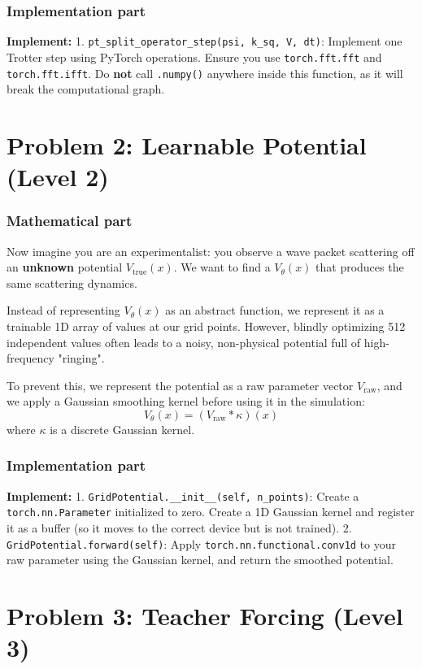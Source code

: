 \documentclass[11pt]{article}
\begin{document}
\subsubsection*{Implementation part}
\textbf{Implement:}
1. \lstinline|pt_split_operator_step(psi, k_sq, V, dt)|: Implement one Trotter step using PyTorch operations. Ensure you use \lstinline|torch.fft.fft| and \lstinline|torch.fft.ifft|. Do \textbf{not} call \lstinline|.numpy()| anywhere inside this function, as it will break the computational graph.

\section*{Problem 2: Learnable Potential (Level 2)}

\subsubsection*{Mathematical part}
Now imagine you are an experimentalist: you observe a wave packet scattering off an \textbf{unknown} potential $V_{\text{true}}(x)$. We want to find a $V_\theta(x)$ that produces the same scattering dynamics.

Instead of representing $V_\theta(x)$ as an abstract function, we represent it as a trainable 1D array of values at our grid points. However, blindly optimizing 512 independent values often leads to a noisy, non-physical potential full of high-frequency "ringing". 

To prevent this, we represent the potential as a raw parameter vector $V_{\text{raw}}$, and we apply a Gaussian smoothing kernel before using it in the simulation:
$$
V_\theta(x) = (V_{\text{raw}} * \kappa)(x)
$$
where $\kappa$ is a discrete Gaussian kernel.

\subsubsection*{Implementation part}
\textbf{Implement:}
1. \lstinline|GridPotential.__init__(self, n_points)|: Create a \lstinline|torch.nn.Parameter| initialized to zero. Create a 1D Gaussian kernel and register it as a buffer (so it moves to the correct device but is not trained).
2. \lstinline|GridPotential.forward(self)|: Apply \lstinline|torch.nn.functional.conv1d| to your raw parameter using the Gaussian kernel, and return the smoothed potential.

\section*{Problem 3: Teacher Forcing (Level 3)}
\end{document}
